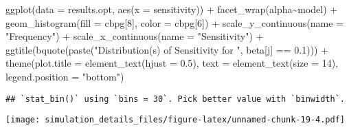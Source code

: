 \documentclass[
]{article}
\newenvironment{Shaded}{\begin{snugshade}}{\end{snugshade}}
\newcommand{\AttributeTok}[1]{\textcolor[rgb]{0.77,0.63,0.00}{#1}}
\newcommand{\DecValTok}[1]{\textcolor[rgb]{0.00,0.00,0.81}{#1}}
\newcommand{\FloatTok}[1]{\textcolor[rgb]{0.00,0.00,0.81}{#1}}
\newcommand{\FunctionTok}[1]{\textcolor[rgb]{0.00,0.00,0.00}{#1}}
\newcommand{\NormalTok}[1]{#1}
\newcommand{\SpecialCharTok}[1]{\textcolor[rgb]{0.00,0.00,0.00}{#1}}
\newcommand{\StringTok}[1]{\textcolor[rgb]{0.31,0.60,0.02}{#1}}
\begin{document}
\begin{Shaded}
\begin{Highlighting}[]
\FunctionTok{ggplot}\NormalTok{(}\AttributeTok{data =}\NormalTok{ results.opt,}
       \FunctionTok{aes}\NormalTok{(}\AttributeTok{x =}\NormalTok{ sensitivity)) }\SpecialCharTok{+}
  \FunctionTok{facet\_wrap}\NormalTok{(alpha}\SpecialCharTok{\textasciitilde{}}\NormalTok{model) }\SpecialCharTok{+}
  \FunctionTok{geom\_histogram}\NormalTok{(}\AttributeTok{fill =}\NormalTok{ cbpg[}\DecValTok{8}\NormalTok{], }\AttributeTok{color =}\NormalTok{ cbpg[}\DecValTok{6}\NormalTok{]) }\SpecialCharTok{+}
  \FunctionTok{scale\_y\_continuous}\NormalTok{(}\AttributeTok{name =} \StringTok{"Frequency"}\NormalTok{) }\SpecialCharTok{+}
  \FunctionTok{scale\_x\_continuous}\NormalTok{(}\AttributeTok{name =} \StringTok{"Sensitivity"}\NormalTok{) }\SpecialCharTok{+}
  \FunctionTok{ggtitle}\NormalTok{(}\FunctionTok{bquote}\NormalTok{(}\FunctionTok{paste}\NormalTok{(}\StringTok{"Distribution(s) of Sensitivity for "}\NormalTok{, beta[j] }\SpecialCharTok{==} \FloatTok{0.1}\NormalTok{))) }\SpecialCharTok{+}
  \FunctionTok{theme}\NormalTok{(}\AttributeTok{plot.title =} \FunctionTok{element\_text}\NormalTok{(}\AttributeTok{hjust =} \FloatTok{0.5}\NormalTok{), }
        \AttributeTok{text =} \FunctionTok{element\_text}\NormalTok{(}\AttributeTok{size =} \DecValTok{14}\NormalTok{),}
        \AttributeTok{legend.position =} \StringTok{"bottom"}\NormalTok{)}
\end{Highlighting}
\end{Shaded}

\begin{verbatim}
## `stat_bin()` using `bins = 30`. Pick better value with `binwidth`.
\end{verbatim}

\texttt{[image: simulation\_details\_files/figure-latex/unnamed-chunk-19-4.pdf]}
\end{document}
